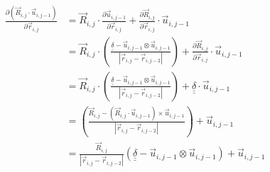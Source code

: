 \documentclass{article}
\renewcommand{\ij}{_{i,j}}
\newcommand{\ijj}{_{i,j-1}}
\newcommand{\ijjj}{_{i,j-2}}
\newcommand{\magn}[1]{\left\vert #1 \right\vert }
\renewcommand{\part}[2]{\frac{\partial #1 }{\partial #2}}
\newcommand{\ten}[1]{\underline{\underline{#1}}}
\newcommand{\rij}{\vec{r} \ij}
\newcommand{\Rij}{\vec{R} \ij}
\newcommand{\rijjj}{\vec{r} \ijjj}
\newcommand{\uijj}{\vec{u} \ijj}
\begin{document}
\begin{align*}
  \part{\left(\vec{R}\ij \cdot \vec{u} \ijj \right)}{\vec{r}\ij}   
  &= 
  \vec{R}\ij \cdot \part{\vec{u} \ijj}{\vec{r} \ij} + \part{\vec{R} \ij}{\vec{r} \ij} \cdot \vec{u}\ijj
  \\
  &= 
  \vec{R}\ij \cdot 
  \left(
  {
  \frac{\ten{\delta} - \uijj \otimes \uijj}{\magn{\rij - \rijjj}}
  }
  \right)
  +
  \part{\vec{R} \ij}{\vec{r} \ij} \cdot \vec{u}\ijj
  \\
  &= 
  \vec{R}\ij \cdot 
  \left(
  {
  \frac{\ten{\delta} - \uijj \otimes \uijj}{\magn{\rij - \rijjj}}
  }
  \right)
  + \ten{\delta} \cdot \vec{u} \ijj 
  \\
  &= 
  \left(
  {
  \frac{\Rij - (\Rij \cdot \uijj ) \times \uijj}{\magn{\rij - \rijjj}}
  }
  \right)
  + 
  \vec{u} \ijj 
  \\ 
  &=
  \frac{\Rij}{\magn{\rij - \rijjj}}
  \left(
   \ten{\delta} - \uijj \otimes \uijj 
  \right)
  + \uijj
\end{align*}
\end{document}
